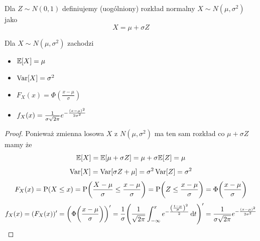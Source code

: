 \begin{definition}
	Dla \(Z \sim N(0, 1)\) definiujemy (uogólniony) rozkład normalny \(X \sim N(\mu, \sigma^2)\) jako
	\[
		X = \mu + \sigma Z
	\]
\end{definition}

\begin{theorem}
	Dla \(X \sim N(\mu, \sigma^2)\) zachodzi
	\begin{itemize}
		\item \(\ev{X} = \mu\)
		\item \(\variance{X} = \sigma^2\)
		\item \(F_X(x) = \Phi(\frac{x - \mu}{\sigma})\)
		\item \(f_X(x) = \frac{1}{\sigma \sqrt{2\pi}}e^{-\frac{\left(x-\mu\right)^2}{2\sigma^2}}\)
	\end{itemize}
\end{theorem}
\begin{proof}
	Ponieważ zmienna losowa \( X\) z \(N(\mu, \sigma^2) \) ma ten sam rozkład co \( \mu + \sigma Z \) mamy że
	\[
		\expected{X} = \expected{\mu + \sigma Z} = \mu + \sigma \ev{Z} = \mu
	\]
	\[
		\variance{X} = \variance{\sigma Z + \mu} = \sigma^2 \variance{Z} = \sigma^2
	\]
	\[
		F_X(x) = \prob\pars{X \leq x} = \prob\pars{\frac{X-\mu}{\sigma} \leq \frac{x-\mu}{\sigma}} = \prob\pars{Z \leq \frac{x-\mu}{\sigma}} = \Phi\pars{\frac{x-\mu}{\sigma}}
	\]
	\[
		f_X(x) = (F_X(x))' = \pars{\Phi\pars{\frac{x-\mu}{\sigma}}}' = \frac{1}{\sigma} \pars{\frac{1}{\sqrt{2\pi}} \int_{-\infty}^{x} e^{-\frac{\pars{\frac{t-\mu}{\sigma}}^2}{2}} \diff t}' = \frac{1}{\sigma \sqrt{2\pi}}e^{-\frac{\pars{x-\mu}^2}{2\sigma^2}}
	\]
\end{proof}

